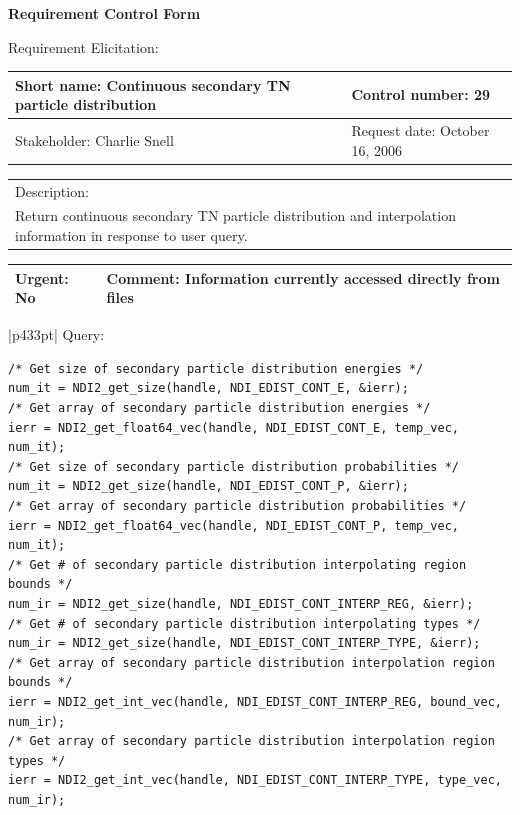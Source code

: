 \begin{center}\Large\bf
Requirement Control Form
\end{center}
\vspace{24pt}

Requirement Elicitation:

\begin{tabular}{|p{211pt}|p{211pt}|} \hline
Short name: Continuous secondary TN particle distribution & Control number: 29\\ \hline
Stakeholder: Charlie Snell & Request date: October 16, 2006\\
\end{tabular}
\begin{tabular}{|p{433pt}|} \hline
Description: \\ 
Return continuous secondary TN particle distribution and interpolation
information in response to user query. \\
\hline
\end{tabular} 
\begin{tabular}{|p{211pt}|p{211pt}|} \hline
Urgent: No & Comment: Information currently accessed directly from files\\ \hline
\end{tabular}

\vspace{12pt}

\begin{tabular}{|p{433pt}|} \hline
Query:
\begin{verbatim}
/* Get size of secondary particle distribution energies */
num_it = NDI2_get_size(handle, NDI_EDIST_CONT_E, &ierr);
/* Get array of secondary particle distribution energies */
ierr = NDI2_get_float64_vec(handle, NDI_EDIST_CONT_E, temp_vec, num_it);
/* Get size of secondary particle distribution probabilities */
num_it = NDI2_get_size(handle, NDI_EDIST_CONT_P, &ierr);
/* Get array of secondary particle distribution probabilities */
ierr = NDI2_get_float64_vec(handle, NDI_EDIST_CONT_P, temp_vec, num_it);
/* Get # of secondary particle distribution interpolating region bounds */
num_ir = NDI2_get_size(handle, NDI_EDIST_CONT_INTERP_REG, &ierr);
/* Get # of secondary particle distribution interpolating types */
num_ir = NDI2_get_size(handle, NDI_EDIST_CONT_INTERP_TYPE, &ierr);
/* Get array of secondary particle distribution interpolation region bounds */
ierr = NDI2_get_int_vec(handle, NDI_EDIST_CONT_INTERP_REG, bound_vec, num_ir);
/* Get array of secondary particle distribution interpolation region types */
ierr = NDI2_get_int_vec(handle, NDI_EDIST_CONT_INTERP_TYPE, type_vec, num_ir);
\end{verbatim}
\\ \hline
\end{tabular}
\vspace{24pt}

